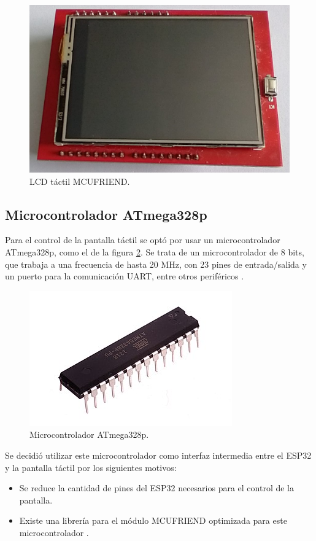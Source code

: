 \begin{figure}[htbp]
	\centering
	\includegraphics[width=.5\textwidth]{./Figures/LCDFrente.jpeg}
	\caption{LCD táctil MCUFRIEND.}
	\label{fig:LCDFrente}
\end{figure}

\subsection{Microcontrolador ATmega328p}

Para el control de la pantalla táctil se optó por usar un microcontrolador ATmega328p, como el de la figura \ref{fig:ATmega328p}. Se trata de un microcontrolador de 8 bits, que trabaja a una frecuencia de hasta 20 MHz, con 23 pines de entrada/salida y un puerto para la comunicación UART, entre otros periféricos \citep{WEBSITE:6}.

\begin{figure}[htbp]
	\centering
	\includegraphics[width=.3\textwidth]{./Figures/ATMEGA328P.jpg}
	\caption{Microcontrolador ATmega328p\protect\footnotemark.}
	\label{fig:ATmega328p}
\end{figure}


Se decidió utilizar este microcontrolador como interfaz intermedia entre el ESP32 y la pantalla táctil por los siguientes motivos:

\begin{itemize}
	\item Se reduce la cantidad de pines del ESP32 necesarios para el control de la pantalla.
	\item Existe una librería para el módulo MCUFRIEND optimizada para este microcontrolador \citep{WEBSITE:1}.
\end{itemize}
	
